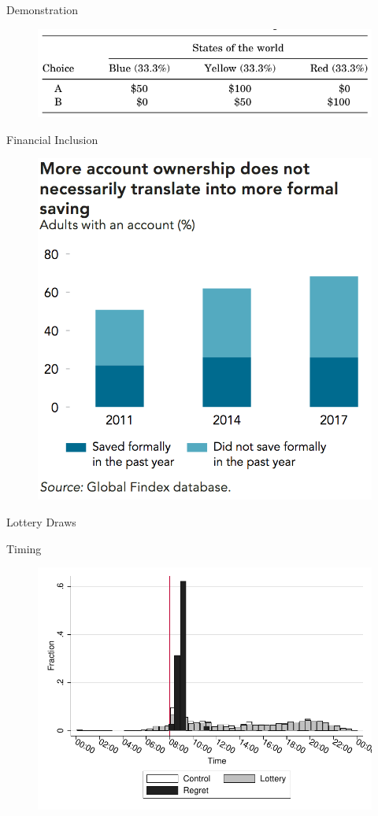\documentclass[aspectratio=169]{beamer}
\begin{document}
\begin{frame}{Demonstration}

	\begin{figure}[H]
		\centering
		\includegraphics[width=0.8\linewidth]{fig-lottery.png}
	\end{figure}

\end{frame}

\begin{frame}{Financial Inclusion}

	\begin{figure}[H]
		\centering
		\includegraphics[width=0.45\linewidth]{fig-findex.png}
	\end{figure}

\end{frame}

\begin{frame}{Lottery Draws}

	

\end{frame}

\begin{frame}{Timing}

	\begin{figure}[H]
		\centering
		\includegraphics[width=0.65\linewidth]{hist-deposits.pdf}
	\end{figure}

\end{frame}
\end{document}
